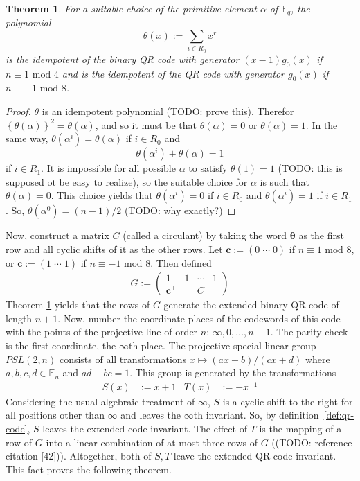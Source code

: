 \documentclass{article}
\newcommand{\F}{\mathbb{F}}
\renewcommand{\mod}{\text{ mod }}
\newcommand{\trans}[1]{#1^\top}
\newcommand{\mt}{\mapsto}
\renewcommand{\=}{\equiv}
\renewcommand{\i}{^{-1}}
\newcommand{\set}[1]{\left\{ #1 \right\}}
\renewcommand{\v}{\mathbf}
\theoremstyle{plain}
\newtheorem{thm}{Theorem}[subsection]
\theoremstyle{definition}
\newcommand{\TODO}[1]{(TODO: #1)}
\begin{document}
\begin{thm}
  \label{thm:suitable-theta}
  For a suitable choice of the primitive element $\alpha$ of $\F_q$, the polynomial
  $$ \theta(x) := \sum_{i \in R_0} x^r $$
  is the idempotent of the binary QR code with generator $(x-1) g_0(x)$ if $n \= 1 \mod 4$
  and is the idempotent of the QR code with generator $g_0(x)$ if $n \= -1 \mod 8$.
\end{thm}
\begin{proof}
$\theta$ is an idempotent polynomial \TODO{prove this}.
Therefor $\set{\theta(\alpha)}^2 = \theta(\alpha)$, and so it must be that $\theta(\alpha) = 0$ or $\theta(\alpha) = 1$.
In the same way, $\theta(\alpha^i) = \theta(\alpha)$ if $i \in R_0$ and
$$ \theta(\alpha^i) + \theta(\alpha) = 1 $$
if $i \in R_1$.
It is impossible for all possible $\alpha$ to satisfy $\theta(1) = 1$ \TODO{this is supposed ot be easy to realize}, so the suitable choice for $\alpha$ is such that $\theta(\alpha) = 0$.
This choice yields that $\theta(\alpha^i) = 0$ if $i \in R_0$ and $\theta(\alpha^i) = 1$ if $i \in R_1$.
So, $\theta(\alpha^0) = (n-1)/2$ \TODO{why exactly?}
\end{proof}

Now, construct a matrix $C$ (called a circulant) by taking the word $\v \theta$ as the first row and all cyclic shifts of it as the other rows.
Let $\v c := (0 \; \cdots \; 0)$ if $n \= 1 \mod 8$, or $\v c := (1 \; \cdots \; 1)$ if $n \= -1 \mod 8$.
Then defined
\begin{align}
  G := \begin{pmatrix}
    1 & 1 & \cdots & 1 \\
    \trans{\v c} & & C &
  \end{pmatrix}
\end{align}
Theorem \ref{thm:suitable-theta} yields that the rows of $G$ generate the extended binary QR code of length $n+1$.
Now, number the coordinate places of the codewords of this code with the points of the projective line of order $n$: $\infty, 0, \dots, n-1$.
The parity check is the first coordinate, the $\infty$th place.
The projective special linear group $PSL(2,n)$ consists of all transformations $x \mt (ax + b)/(cx + d)$ where $a, b, c, d \in \F_n$ and $ad - bc = 1$.
This group is generated by the transformations
\begin{align*}
  S(x) &:= x + 1 & T(x) &:= -x\i
\end{align*}
Considering the usual algebraic treatment of $\infty$, $S$ is a cyclic shift to the right for all positions other than $\infty$ and leaves the $\infty$th invariant.
So, by definition~\ref{def:qr-code}, $S$ leaves the extended code invariant.
The effect of $T$ is the mapping of a row of $G$ into a linear combination of at most three rows of $G$ (\TODO{reference citation [42]}).
Altogether, both of $S,T$ leave the extended QR code invariant.
This fact proves the following theorem.
\end{document}
